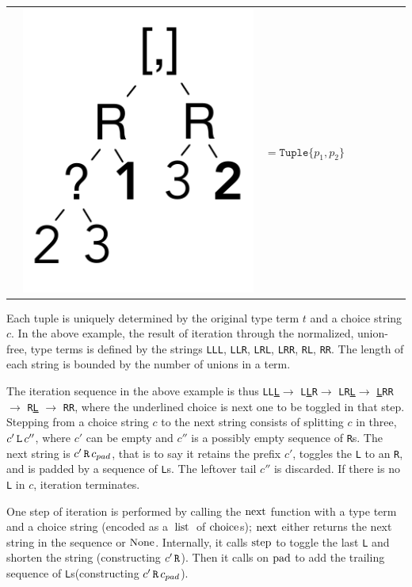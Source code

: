 \documentclass[a4paper,english]{lipics-v2019}
\newcommand{\xt}[1]{\texttt{#1}}
\renewcommand{\L}{{\tt L}\xspace}
\newcommand{\Ls}{{\tt L}s\xspace}
\newcommand{\R}{{\tt R}\xspace}
\newcommand{\uL}{{\underline{\tt L}}\xspace}
\renewcommand{\c}[1]{\ensuremath{\text{\lstinline{#1}}}\xspace}
\newcommand{\tuple}[1]{\xt{Tuple\{}#1\xt{\}}}
\begin{document}
{\begin{tabular}{@{}l@{~}ll@{~}ll@{~}ll@{~}l}
&\begin{minipage}{1.2cm}\includegraphics[scale=.25]{figures/tree7.pdf} 
\end{minipage} &  $ =   \tuple{p_1,p_2} $ 
\end{tabular}}

\medskip
\noindent 
Each tuple is uniquely determined by the original type term $t$ and a choice
string $c$. In the above example, the result of iteration through the
normalized, union-free, type terms is defined by the strings \L\L\L, \L\L\R,
\L\R\L, \L\R\R, \R\L, \R\R. The length of each string is bounded by the
number of unions in a term.


The iteration sequence in the above example is thus \L\L\uL $\rightarrow$
\L\uL\R $\rightarrow$ \L\R\uL $\rightarrow$ \uL\R\R $\rightarrow$ \R\uL
$\rightarrow$ \R\R, where the underlined choice is next one to be toggled in
that step. Stepping from a choice string $c$ to the next string consists of
splitting $c$ in three, $c' \,\L\,c''$, where $c'$ can be empty and $c''$ is a
possibly empty sequence of {\R}s.  The next string is $c'\, \R \, c_{pad}$,
that is to say it retains the prefix $c'$, toggles the \L to an \R, and is
padded by a sequence of \Ls. The leftover tail $c''$ is discarded. If there is
no \L in $c$, iteration terminates.

One step of iteration is performed by calling the \c{next} function with a
type term and a choice string (encoded as a \c{list} of \c{choice}\hspace{-0.25em}s); \c{next} either returns the next string in
the sequence or \c{None}. Internally, it calls \c{step} to toggle the
last \L and shorten the string (constructing $c'\,\R$). Then it calls on
\c{pad} to add the trailing sequence of \Ls (constructing $c'\,\R\,c_{pad}$).
\end{document}
